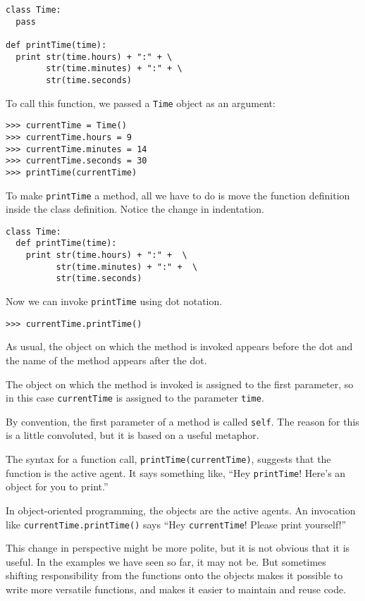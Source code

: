 \beforeverb
\begin{verbatim}
class Time:
  pass

def printTime(time):
  print str(time.hours) + ":" + \
        str(time.minutes) + ":" + \
        str(time.seconds)
\end{verbatim}
\afterverb
%
To call this function, we passed a {\tt Time} object as an argument:

\beforeverb
\begin{verbatim}
>>> currentTime = Time()
>>> currentTime.hours = 9
>>> currentTime.minutes = 14
>>> currentTime.seconds = 30
>>> printTime(currentTime)
\end{verbatim}
\afterverb
%
To make {\tt printTime} a method, all we have to do is
move the function definition inside the class definition.  Notice
the change in indentation.

\beforeverb
\begin{verbatim}
class Time:
  def printTime(time):
    print str(time.hours) + ":" +  \
          str(time.minutes) + ":" +  \
          str(time.seconds)
\end{verbatim}
\afterverb
%
Now we can invoke {\tt printTime} using dot notation.


\beforeverb
\begin{verbatim}
>>> currentTime.printTime()
\end{verbatim}
\afterverb
%
As usual, the object on which the method is invoked appears
before the dot and the
name of the method appears after the dot.

The object on which the method is invoked is assigned to the
first parameter, so in this case {\tt currentTime} is assigned
to the parameter {\tt time}.

By convention, the first parameter of a method is
called {\tt self}.  The reason for this is a little
convoluted, but it is based on a useful metaphor.

The syntax for a function call, {\tt printTime(currentTime)},
suggests that the function is the active agent.  It says
something like, ``Hey {\tt printTime}!  Here's an object for
you to print.''

In object-oriented programming, the objects are the active
agents.  An invocation like {\tt currentTime.printTime()}
says ``Hey {\tt currentTime}!  Please print yourself!''

This change in perspective might be more polite, but
it is not obvious that it is useful.  In the examples we
have seen so far, it may not be.  But sometimes shifting
responsibility from the functions onto the objects
makes it possible to write more versatile functions,
and makes it easier to maintain and reuse code.


